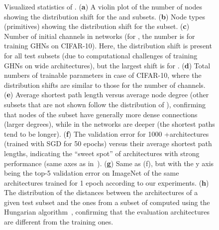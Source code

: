 \begin{figure}[tbhp]
	\caption{\small Visualized statistics of \dataset. (\textbf{a}) A violin plot of the number of nodes showing the distribution shift for the \deep and \dense subsets. (\textbf{b}) Node types (primitives) showing the distribution shift for the \bnfree subset. (\textbf{c}) Number of initial channels in networks (for \iidtrain, the number is for training GHNs on CIFAR-10). Here, the distribution shift is present for all test subsets (due to computational challenges of training GHNs on wide architectures), but the largest shift is for \wide. (\textbf{d}) Total numbers of trainable parameters in case of CIFAR-10, where the distribution shifts are similar to those for the number of channels. (\textbf{e}) Average shortest path length versus average node degree (other subsets that are not shown follow the distribution of \iidtrain), confirming that nodes of the \dense subset have generally more dense connections (larger degrees), while in \deep the networks are deeper (the shortest paths tend to be longer). (\textbf{f}) The validation error for 1000 \iidval+\iidtest architectures (trained with SGD for 50 epochs) versus their average shortest path lengths, indicating the ``sweet spot'' of architectures with strong performance (same axes as in~\cite{you2020graph}). (\textbf{g}) Same as ({f}), but with the y axis being the top-5 validation error on ImageNet of the same architectures trained for 1 epoch according to our experiments. (\textbf{h}) The distribution of the distances between the architectures of a given test subset and the ones from a subset of \iidtrain computed using the Hungarian algorithm~\cite{kuhn1955hungarian}, confirming that the evaluation architectures are different from the training ones.}
	\label{fig:vis_stats}
	\vspace{-2pt}
\end{figure}


